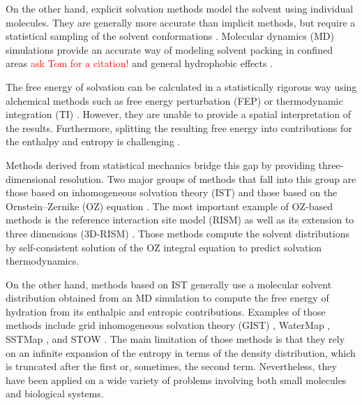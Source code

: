 \documentclass[9pt,tutorial]{livecoms}
\newcommand{\todo}{\textcolor{red}}
\begin{document}
On the other hand, explicit solvation methods model the solvent using individual molecules.
They are generally more accurate than implicit methods, but require a statistical sampling of the solvent conformations \cite{Liu2016-md-solubility,Swails2014-cphmd}.
Molecular dynamics (MD) simulations provide an accurate way of modeling solvent packing in confined areas \cite{}\todo{ask Tom for a citation!} and general hydrophobic effects \cite{Pratt2016-hydrophobicity}.

The free energy of solvation can be calculated in a statistically rigorous way using alchemical methods \cite{Liu2016-md-solubility,Mobley2009-dgsolv,Mobley2014-freesolv} such as free energy perturbation (FEP) \cite{Zwanzig1954-reweighting} or thermodynamic integration (TI) \cite{Kirkwood1935-ti}.
However, they are unable to provide a spatial interpretation of the results.
Furthermore, splitting the resulting free energy into contributions for the enthalpy and entropy is challenging \cite{Peter2004-alchemical-entropy}.

Methods derived from statistical mechanics bridge this gap by providing three-dimensional resolution.
Two major groups of methods that fall into this group are those based on inhomogeneous solvation theory (IST) \cite{Lazaridis1998} and those based on the Ornstein--Zernike (OZ) equation \cite{Hansen2013-simple-liquids}.
The most important example of OZ-based methods is the reference interaction site model (RISM) \cite{Chandler1972-rism} as well as its extension to three dimensions (3D-RISM) \cite{Kovalenko1998-3drism}.
Those methods compute the solvent distributions by self-consistent solution of the OZ integral equation to predict solvation thermodynamics.

On the other hand, methods based on IST generally use a molecular solvent distribution obtained from an MD simulation to compute the free energy of hydration from its enthalpic and entropic contributions.
Examples of those methods include grid inhomogeneous solvation theory (GIST) \cite{Nguyen2012,Ramsey2016}, WaterMap \cite{Young2007-watermap,Abel2008-watermap}, SSTMap \cite{Haider2018-sstmap}, and STOW \cite{Li2012-stow}.
The main limitation of those methods is that they rely on an infinite expansion of the entropy in terms of the density distribution, which is truncated after the first or, sometimes, the second \cite{Nguyen2016-gist-second-order,Waibl2022-gist-solvents} term.
Nevertheless, they have been applied on a wide variety of problems involving both small molecules and biological systems.
\end{document}
